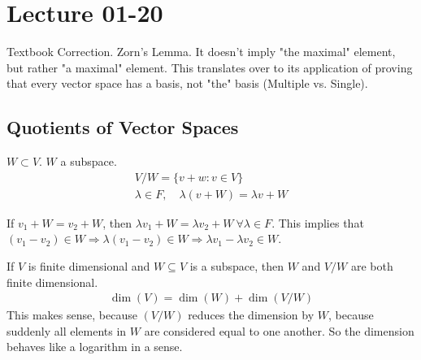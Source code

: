 \documentclass[class=scrartcl, crop=false]{standalone}
\date{2020-01-20}
\begin{document}
\section{Lecture 01-20}

Textbook Correction. Zorn's Lemma. It doesn't imply "the maximal" element, but rather "a maximal" element. This translates over to its application of proving that every vector space has a basis, not "the" basis (Multiple vs. Single).

\subsection{Quotients of Vector Spaces}

$W \subset V$. $W$ a subspace. 
\begin{gather*}
  V / W = \{v + w : v \in V\} \\
  \lambda \in F, \quad \lambda(v + W) = \lambda v + W
\end{gather*} 

If $v_1 + W = v_2 + W$, then $\lambda v_1 + W = \lambda v_2 + W \ \forall \lambda \in F$. This implies that $(v_1 - v_2) \in W \Rightarrow \lambda(v_1 - v_2) \in W \Rightarrow \lambda v_1 - \lambda v_2 \in W$.
\begin{theorem}
  If $V$ is finite dimensional and $W \subseteq V$ is a subspace, then $W$ and $V / W$ are both finite dimensional.
  \begin{gather*}
    \dim(V) = \dim(W) + \dim(V / W)
  \end{gather*} 
  This makes sense, because $(V / W)$ reduces the dimension by $W$, because suddenly all elements in $W$ are considered equal to one another.
  So the dimension behaves like a logarithm in a sense.
\end{theorem} 
\end{document}
